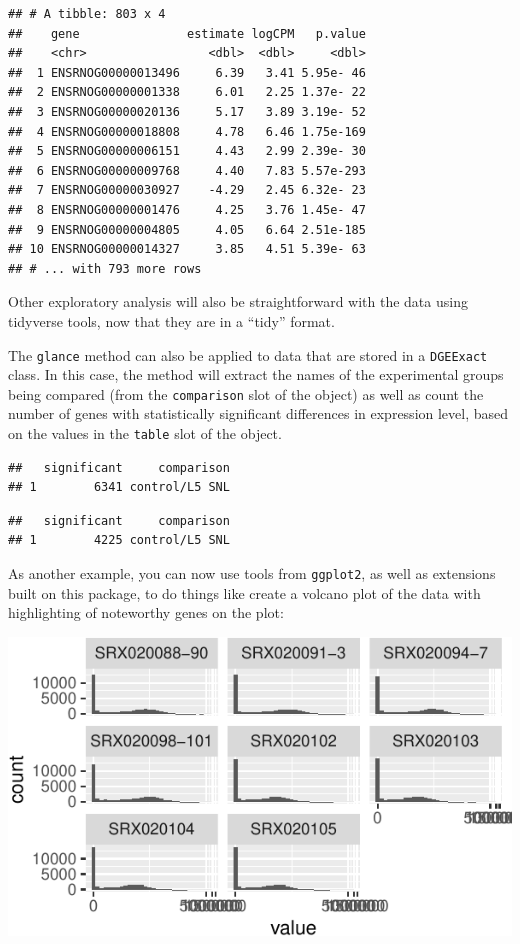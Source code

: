 \documentclass[]{tufte-book}
\begin{document}
\begin{verbatim}
## # A tibble: 803 x 4
##    gene               estimate logCPM   p.value
##    <chr>                 <dbl>  <dbl>     <dbl>
##  1 ENSRNOG00000013496     6.39   3.41 5.95e- 46
##  2 ENSRNOG00000001338     6.01   2.25 1.37e- 22
##  3 ENSRNOG00000020136     5.17   3.89 3.19e- 52
##  4 ENSRNOG00000018808     4.78   6.46 1.75e-169
##  5 ENSRNOG00000006151     4.43   2.99 2.39e- 30
##  6 ENSRNOG00000009768     4.40   7.83 5.57e-293
##  7 ENSRNOG00000030927    -4.29   2.45 6.32e- 23
##  8 ENSRNOG00000001476     4.25   3.76 1.45e- 47
##  9 ENSRNOG00000004805     4.05   6.64 2.51e-185
## 10 ENSRNOG00000014327     3.85   4.51 5.39e- 63
## # ... with 793 more rows
\end{verbatim}

Other exploratory analysis will also be straightforward with the data
using tidyverse tools, now that they are in a ``tidy'' format.

The \texttt{glance} method can also be applied to data that are stored in a
\texttt{DGEExact} class. In this case, the method will extract the names of the
experimental groups being compared (from the \texttt{comparison} slot of the
object) as well as count the number of genes with statistically
significant differences in expression level, based on the values in the
\texttt{table} slot of the object.

\begin{verbatim}
##   significant     comparison
## 1        6341 control/L5 SNL
\end{verbatim}

\begin{verbatim}
##   significant     comparison
## 1        4225 control/L5 SNL
\end{verbatim}

As another example, you can now use tools from \texttt{ggplot2}, as well as
extensions built on this package, to do things like create a volcano
plot of the data with highlighting of noteworthy genes on the plot:

\includegraphics{improve_repro_files/figure-latex/unnamed-chunk-22-1}
\end{document}

